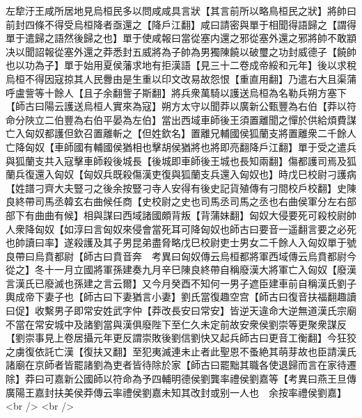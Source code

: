 左犂汙王咸所居地見烏桓民多以問咸咸具言狀【其言前所以略鳥桓民之狀】將帥曰前封四條不得受烏桓降者亟還之【降戶江翻】咸曰請密與單于相聞得語歸之【謂得單于遣歸之語然後歸之也】單于使咸報曰當從塞内還之邪從塞外還之邪將帥不敢顓决以聞詔報從塞外還之莽悉封五威將為子帥為男獨陳饒以破璽之功封威德子【饒帥也以功為子】單于始用夏侯藩求地有拒漢語【見三十二卷成帝綏和元年】後以求稅烏桓不得因寇掠其人民釁由是生重以印文改易故怨恨【重直用翻】乃遣右大且渠蒲呼盧訾等十餘人【且子余翻訾子斯翻】將兵衆萬騎以護送烏桓為名勒兵朔方塞下【師古曰陽云護送烏桓人實來為寇】朔方太守以聞莽以廣新公甄豐為右伯【莽以符命分陜立二伯豐為右伯平晏為左伯】當出西域車師後王須置離聞之憚於供給煩費謀亡入匈奴都護但欽召置離斬之【但姓欽名】置離兄輔國侯狐蘭支將置離衆二千餘人亡降匈奴【車師國有輔國侯猶相也擊胡侯猶將也將即亮翻降戶江翻】單于受之遣兵與狐蘭支共入寇擊車師殺後城長【後城即車師後王城也長知兩翻】傷都護司焉及狐蘭兵復還入匈奴【匈奴兵既殺傷漢吏復與狐蘭支兵還入匈奴也】時戊巳校尉刁護病【姓譜刁齊大夫豎刁之後余按豎刁寺人安得有後史記貨殖傳有刁間校戶校翻】史陳良終帶司馬丞韓玄右曲候任商【史校尉之史也司馬丞司馬之丞也右曲侯軍分左右部部下有曲曲有候】相與謀曰西域諸國頗背叛【背蒲妹翻】匈奴大侵要死可殺校尉帥人衆降匈奴【如淳曰言匈奴來侵會當死耳可降匈奴也師古曰要音一遥翻言要之必死也帥讀曰率】遂殺護及其子男昆弟盡脅略戊巳校尉吏士男女二千餘人入匈奴單于號良帶曰烏賁都尉【師古曰賁音奔　考異曰匈奴傳云烏桓都將軍西域傳云烏賁都尉今從之】冬十一月立國將軍孫建奏九月辛巳陳良終帶自稱廢漢大將軍亡入匈奴【廢漢言漢氏已廢滅也孫建之言云爾】又今月癸酉不知何一男子遮臣建車前自稱漢氏劉子輿成帝下妻子也【師古曰下妻猶言小妻】劉氏當復趣空宫【師古曰復音扶福翻趣讀曰促】收繫男子即常安姓武字仲【莽改長安曰常安】皆逆天違命大逆無道漢氏宗廟不當在常安城中及諸劉當與漢俱廢陛下至仁久未定前故安衆侯劉崇等更聚衆謀反【劉崇事見上卷居攝元年更反謂崇敗後劉信劉快又起兵師古曰更音工衡翻】今狂狡之虜復依託亡漢【復扶又翻】至犯夷滅連未止者此聖恩不蚤絶其萌芽故也臣請漢氏諸廟在京師者皆罷諸劉為吏者皆待除於家【師古曰罷黜其職各使退歸而言在家待遷除】莽曰可嘉新公國師以符命為予四輔明德侯劉龔率禮侯劉嘉等【考異曰燕王旦傳廣陽王嘉封扶美侯莽傳云率禮侯劉嘉未知其改封或别一人也　余按率禮侯劉嘉】<br />
<br />
